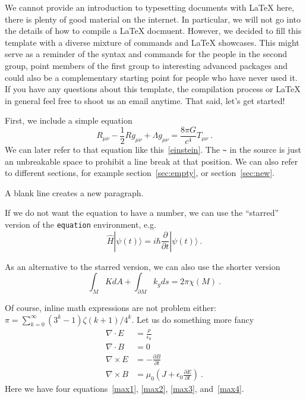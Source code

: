 \documentclass[12pt, a4paper]{article}
\begin{document}
We cannot provide an introduction to typesetting documents with \LaTeX{} here,
there is plenty of good material on the internet. In particular, we will not go
into the details of how to compile a \LaTeX{} docmuent. However, we decided to
fill this template with a diverse mixture of commands and \LaTeX{} showcases.
This might serve as a reminder of the syntax and commands for the people in the
second group, point members of the first group to interesting advanced packages
and could also be a complementary starting point for people who have never used
it. If you have any questions about this template, the compilation process or
\LaTeX{} in general feel free to shoot us an email anytime. That said, let's get
started!

First, we include a simple equation
\begin{equation} \label{einstein}
  R_{\mu \nu} - \frac{1}{2} R g_{\mu \nu} + \Lambda g_{\mu \nu} = \frac{8 \pi
  G}{c^4} T_{\mu \nu} \: .
\end{equation}
We can later refer to that equation like this~\eqref{einstein}. The \texttt{\~}
in the source is just an unbreakable space to prohibit a line break at that
position. We can also refer to different sections, for example
section~\ref{sec:empty}, or section~\ref{sec:new}.

A blank line creates a new paragraph.

If we do not want the equation to have a number, we can use the ``starred''
version of the \texttt{equation} environment, e.g.
\begin{equation*}
  \hat{H} | \psi(t) \rangle =
  i \hbar \frac{\partial}{\partial t} | \psi (t) \rangle \: .
\end{equation*}

As an alternative to the starred version, we can also use the shorter version
\[
  \int_M K dA + \int_{\partial M} k_g ds = 2 \pi \chi (M) \:.
\]

Of course, inline math expressions are not problem either:~$\pi =
\sum_{k=0}^{\infty} (3^k - 1) \zeta (k + 1) / 4^k$.
Let us do something more fancy
\begin{align}
  \nabla \cdot E &= \frac{\rho}{\epsilon_0} \label{max1} \\
  \nabla \cdot B &= 0 \label{max2} \\
  \nabla \times E &= - \frac{\partial B}{\partial t} \label{max3} \\
  \nabla \times B &= \mu_0
  \left(J + \epsilon_0 \frac{\partial E}{\partial t} \right) \: . \label{max4}
\end{align}
Here we have four equations~\eqref{max1}, \eqref{max2}, \eqref{max3},
and~\eqref{max4}.
\end{document}
